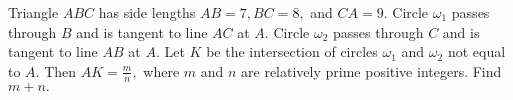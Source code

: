 Triangle $ABC$ has side lengths $AB=7, BC=8, $ and $CA=9.$ Circle $\omega_1$ passes through $B$ and is tangent to line $AC$ at $A.$ Circle $\omega_2$ passes through $C$ and is tangent to line $AB$ at $A.$ Let $K$ be the intersection of circles $\omega_1$ and $\omega_2$ not equal to $A.$ Then $AK=\tfrac{m}{n},$ where $m$ and $n$ are relatively prime positive integers. Find $m+n.$